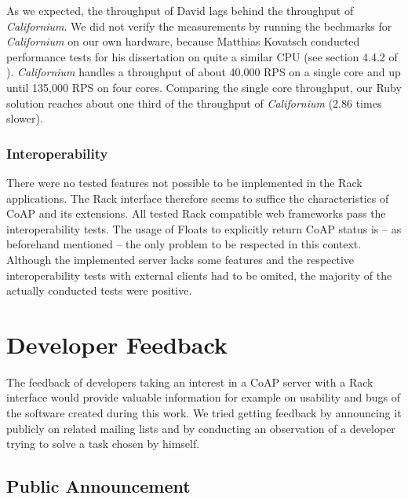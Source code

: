			As we expected, the throughput of David lags behind the throughput
			of \emph{Californium}. We did not verify the measurements by
			running the bechmarks for \emph{Californium} on our own hardware,
			because Matthias Kovatsch conducted performance tests for his
			dissertation on quite a similar \ac{CPU} (see section 4.4.2 of
			\cite{scalable-iot}). \emph{Californium} handles a throughput of
			about 40,000 \ac{RPS} on a single core and up until 135,000
			\ac{RPS} on four cores. Comparing the single core throughput, our
			Ruby solution reaches about one third of the throughput of
			\emph{Californium} (2.86 times slower).

		\subsubsection{Interoperability}

			There were no tested features not possible to be implemented in the
			Rack applications. The Rack interface therefore seems to suffice
			the characteristics of \ac{CoAP} and its extensions. All tested
			Rack compatible web frameworks pass the interoperability tests. The
			usage of Floats to explicitly return \ac{CoAP} status is -- as
			beforehand mentioned -- the only problem to be respected in this
			context. Although the implemented server lacks some features and
			the respective interoperability tests with external clients had to
			be omited, the majority of the actually conducted tests were
			positive.

\section{Developer Feedback}

	The feedback of developers taking an interest in a \ac{CoAP} server with a
	Rack interface would provide valuable information for example on usability
	and bugs of the software created during this work. We tried getting
	feedback by announcing it publicly on related mailing lists and by
	conducting an observation of a developer trying to solve a task chosen by
	himself.

	\subsection{Public Announcement}

